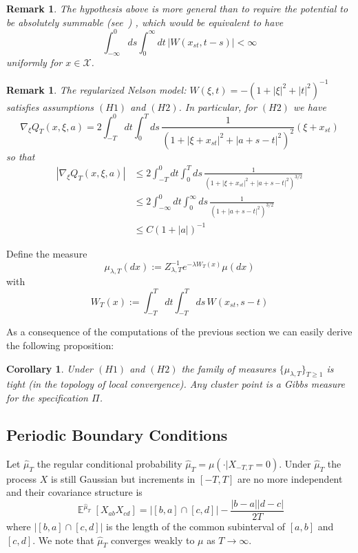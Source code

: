 \documentclass[a4paper,12pt,reqno]{amsart}
\newtheorem{corollary}[theorem]{Corollary}
\newtheorem{remark}[theorem]{Remark}
\DeclareMathOperator{\expect}{{\mathbb E}}
\newcommand{\X}{\mathcal{X}}
\newcommand{\wmu}{\widehat\mu}
\begin{document}
\begin{remark}
The hypothesis above is more general than to require the potential to
be \emph{absolutely summable} (see~\cite{Georgii})
, which would be equivalent to have
$$
\int_{-\infty}^{0}ds  \int_{0}^{\infty} dt\, |W(x_{st},t-s)| < \infty
$$  
uniformly for $x \in \X$.
\end{remark}
\begin{remark}
The regularized Nelson model:
$
W(\xi,t) = - (1+|\xi|^2+|t|^2)^{-1}
$  
 satisfies assumptions $(H1)$ and $(H2)$. In particular,
for $(H2)$  we have
\begin{equation}
\nabla_\xi Q_T(x,\xi,a) =  2 \int_{-T}^0 dt \int_{0}^T ds \,
 \frac{1}{(1+|\xi+x_{st}|^2+|a+s-t|^2)^2} (\xi+x_{st})
\end{equation}
so that
\begin{equation}
  \begin{split}
|\nabla_\xi Q_T(x,\xi,a)| & \le  2 \int_{-T}^0 dt \int_{0}^T ds \,
 \frac{1}{(1+|\xi+x_{st}|^2+|a+s-t|^2)^{3/2}} 
\\ & \le  2 \int_{-\infty}^0 dt \int_{0}^\infty ds \,
 \frac{1}{(1+|a+s-t|^2)^{3/2}}     
\\ & \le  C (1+|a|)^{-1}
  \end{split}
\end{equation}

\end{remark}


Define the measure
\begin{equation}
\mu_{\lambda,T}(dx) := Z_{\lambda,T}^{-1} e^{-\lambda W_T(x)} \mu(dx)   
\end{equation}
with
$$
W_T(x) := \int_{-T}^T dt \int_{-T}^T ds \, W(x_{st},s-t)
$$


As a consequence of the computations of the previous section we can
easily derive the following proposition:

\begin{corollary}
\label{prop:tight}
 Under $(H1)$ and $(H2)$
the family of measures $\{\mu_{\lambda,T} \}_{T \ge 1}$ is tight (in
the topology of local convergence). Any cluster point is a Gibbs
measure for the specification $\Pi$.
\end{corollary}


\subsection{Periodic Boundary Conditions}
Let $\widehat \mu_{T}$ the regular conditional probability
$
\wmu_T = \mu(\cdot | X_{-T,T} = 0)
$.
Under $\widehat \mu_T$ the process $X$ is still Gaussian but
increments in $[-T,T]$ are no more independent and their covariance
structure is
$$
\expect^{\wmu_T} [X_{ab} X_{cd}] = |[b,a]\cap[c,d]|- \frac{|b-a||d-c|}{2T} 
$$
where $|[b,a]\cap[c,d]|$ is the length of the common subinterval of
$[a,b]$ and $[c,d]$.
We note that $\wmu_T$ converges weakly to $\mu$ as $T \to \infty$.
\end{document}
